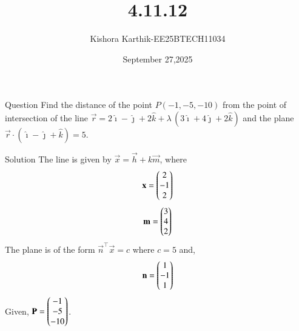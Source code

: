 \documentclass{beamer}
\begin{document}
\title 
{4.11.12}
\date{September 27,2025}


\author 
{Kishora Karthik-EE25BTECH11034}
\frame{\titlepage}
\begin{frame}{Question}
Find the distance of the point $P(-1,-5,-10)$ from the point of intersection of the line
$\vec{r} = 2\hat{\imath}-\hat{\jmath}+2\hat{k}+\lambda\,(3\hat{\imath}+4\hat{\jmath}+2\hat{k})$
and the plane
$\vec{r}\cdot(\hat{\imath}-\hat{\jmath}+\hat{k})=5$.
\\
\end{frame}

\begin{frame}{ Solution}
The line is given by $\vec{x}=\vec{h}+k\vec{m}$, where 
\begin{align}
    \mathbf{x}=\begin{pmatrix}2\\-1\\2\end{pmatrix}
\end{align}
\begin{align}
    \mathbf{m}=\begin{pmatrix}3\\4\\2\end{pmatrix}
\end{align}
The plane is of the form $\vec{n}^\top\vec{x}=c$ where $c=5$ and,
\begin{align}
\mathbf{n}=\begin{pmatrix}1\\-1\\1\end{pmatrix}
\end{align}
Given, $\mathbf{P}=\begin{pmatrix}-1\\-5\\-10\end{pmatrix}$.
\end{frame}
\end{document}
